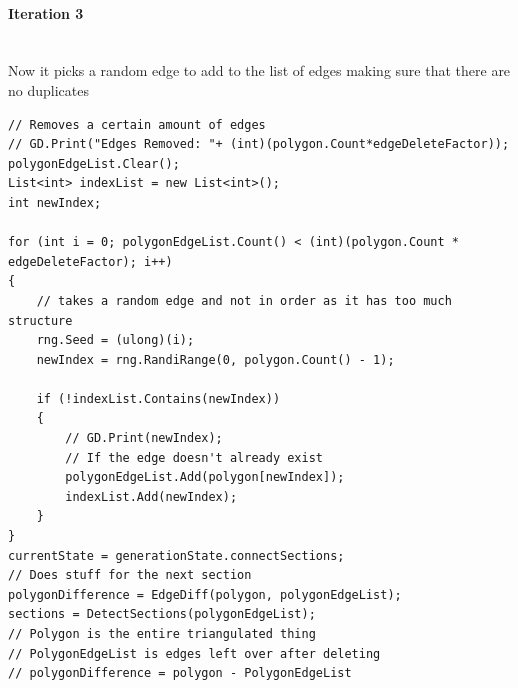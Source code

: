 \documentclass{article}
\newcommand{\myparagraph}[1]{\paragraph{#1}\mbox{}\\} %
\begin{document}
\myparagraph{Iteration 3}
Now it picks a random edge to add to the list of edges making sure that there are no duplicates
\begin{lstlisting}
// Removes a certain amount of edges
// GD.Print("Edges Removed: "+ (int)(polygon.Count*edgeDeleteFactor));
polygonEdgeList.Clear();
List<int> indexList = new List<int>();
int newIndex;

for (int i = 0; polygonEdgeList.Count() < (int)(polygon.Count * edgeDeleteFactor); i++)
{
    // takes a random edge and not in order as it has too much structure
    rng.Seed = (ulong)(i);
    newIndex = rng.RandiRange(0, polygon.Count() - 1);

    if (!indexList.Contains(newIndex))
    {
        // GD.Print(newIndex);
        // If the edge doesn't already exist
        polygonEdgeList.Add(polygon[newIndex]);
        indexList.Add(newIndex);
    }
}
currentState = generationState.connectSections;
// Does stuff for the next section
polygonDifference = EdgeDiff(polygon, polygonEdgeList);
sections = DetectSections(polygonEdgeList);
// Polygon is the entire triangulated thing
// PolygonEdgeList is edges left over after deleting
// polygonDifference = polygon - PolygonEdgeList
\end{lstlisting}
\end{document}
